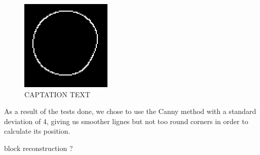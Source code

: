   	\begin{figure}[hb]
  \centering
  \includegraphics[scale=0.5]{figures/Canny_25.png}
  \caption[LABEL] {CAPTATION TEXT}
\end{figure}	
	

As a result of the tests done, we chose to use the Canny method with a standard deviation of 4, giving us smoother lignes but not too round corners in order to calculate its position.


\begin{flushleft}
 block reconstruction ?
 \end{flushleft}